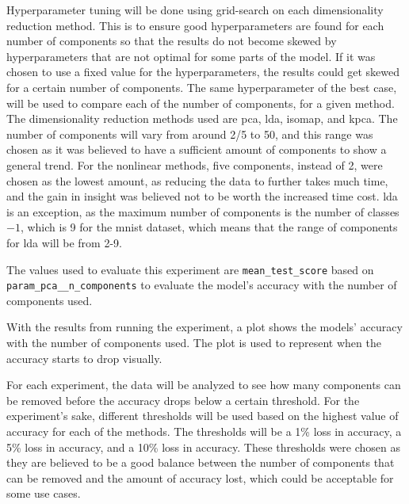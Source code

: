 Hyperparameter tuning will be done using grid-search on each dimensionality reduction method. This is to ensure good hyperparameters are found for each number of components so that the results do not become skewed by hyperparameters that are not optimal for some parts of the model. If it was chosen to use a fixed value for the hyperparameters, the results could get skewed for a certain number of components. The same hyperparameter of the best case, will be used to compare each of the number of components, for a given method.
The dimensionality reduction methods used are \gls{pca}, \gls{lda}, \gls{isomap}, and \gls{kpca}. The number of components will vary from around 2/5 to 50, and this range was chosen as it was believed to have a sufficient amount of components to show a general trend. For the nonlinear methods, five components, instead of 2, were chosen as the lowest amount, as reducing the data to further takes much time, and the gain in insight was believed not to be worth the increased time cost. \gls{lda} is an exception, as the maximum number of components is the number of classes $-1$, which is 9 for the \gls{mnist} dataset, which means that the range of components for \gls{lda} will be from 2-9.

The values used to evaluate this experiment are \texttt{mean\_test\_score} based on \texttt{param\_pca\_\_n\_components} to evaluate the model's accuracy with the number of components used.

With the results from running the experiment, a plot shows the models' accuracy with the number of components used. The plot is used to represent when the accuracy starts to drop visually.

For each experiment, the data will be analyzed to see how many components can be removed before the accuracy drops below a certain threshold. For the experiment's sake, different thresholds will be used based on the highest value of accuracy for each of the methods. The thresholds will be a 1\% loss in accuracy, a 5\% loss in accuracy, and a 10\% loss in accuracy. These thresholds were chosen as they are believed to be a good balance between the number of components that can be removed and the amount of accuracy lost, which could be acceptable for some use cases.


